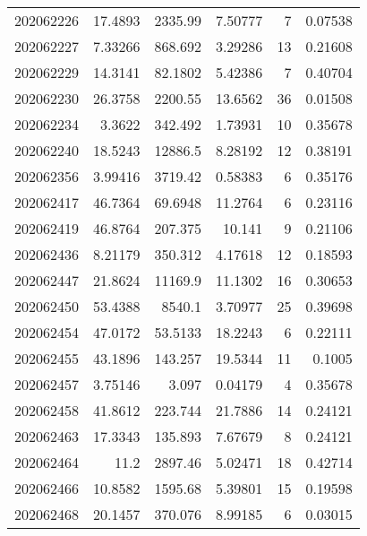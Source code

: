 \begin{tabular}{rrrrrr}
 202062226 &         17.4893  &     2335.99   &            7.50777 &           7 & 0.07538 \\
 202062227 &          7.33266 &      868.692  &            3.29286 &          13 & 0.21608 \\
 202062229 &         14.3141  &       82.1802 &            5.42386 &           7 & 0.40704 \\
 202062230 &         26.3758  &     2200.55   &           13.6562  &          36 & 0.01508 \\
 202062234 &          3.3622  &      342.492  &            1.73931 &          10 & 0.35678 \\
 202062240 &         18.5243  &    12886.5    &            8.28192 &          12 & 0.38191 \\
 202062356 &          3.99416 &     3719.42   &            0.58383 &           6 & 0.35176 \\
 202062417 &         46.7364  &       69.6948 &           11.2764  &           6 & 0.23116 \\
 202062419 &         46.8764  &      207.375  &           10.141   &           9 & 0.21106 \\
 202062436 &          8.21179 &      350.312  &            4.17618 &          12 & 0.18593 \\
 202062447 &         21.8624  &    11169.9    &           11.1302  &          16 & 0.30653 \\
 202062450 &         53.4388  &     8540.1    &            3.70977 &          25 & 0.39698 \\
 202062454 &         47.0172  &       53.5133 &           18.2243  &           6 & 0.22111 \\
 202062455 &         43.1896  &      143.257  &           19.5344  &          11 & 0.1005  \\
 202062457 &          3.75146 &        3.097  &            0.04179 &           4 & 0.35678 \\
 202062458 &         41.8612  &      223.744  &           21.7886  &          14 & 0.24121 \\
 202062463 &         17.3343  &      135.893  &            7.67679 &           8 & 0.24121 \\
 202062464 &         11.2     &     2897.46   &            5.02471 &          18 & 0.42714 \\
 202062466 &         10.8582  &     1595.68   &            5.39801 &          15 & 0.19598 \\
 202062468 &         20.1457  &      370.076  &            8.99185 &           6 & 0.03015 \\

\end{tabular}
